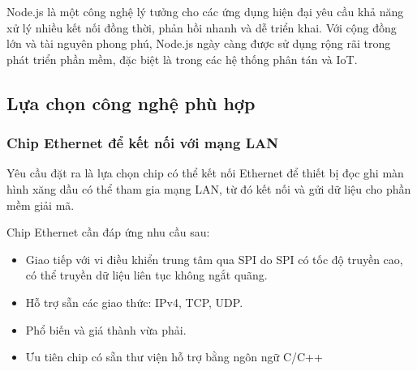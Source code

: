 Node.js là một công nghệ lý tưởng cho các ứng dụng hiện đại yêu cầu khả năng xử lý nhiều kết nối đồng thời, phản hồi nhanh và dễ triển khai. Với cộng đồng lớn và tài nguyên phong phú, Node.js ngày càng được sử dụng rộng rãi trong phát triển phần mềm, đặc biệt là trong các hệ thống phân tán và IoT.

\FloatBarrier
\subsection{Lựa chọn công nghệ phù hợp}


\subsubsection{Chip Ethernet để kết nối với mạng LAN}

Yêu cầu đặt ra là lựa chọn chip có thể kết nối Ethernet để thiết bị đọc ghi màn hình xăng dầu có thể tham gia mạng LAN, từ đó kết nối và gửi dữ liệu cho phần mềm giải mã.

Chip Ethernet cần đáp ứng nhu cầu sau:

\begin{itemize}
    \item Giao tiếp với vi điều khiển trung tâm qua SPI do SPI có tốc độ truyền cao, có thể truyền dữ liệu liên tục không ngắt quãng.
    \item Hỗ trợ sẵn các giao thức: IPv4, TCP, UDP.
    \item Phổ biến và giá thành vừa phải.
    \item Ưu tiên chip có sẵn thư viện hỗ trợ bằng ngôn ngữ C/C++
\end{itemize}


